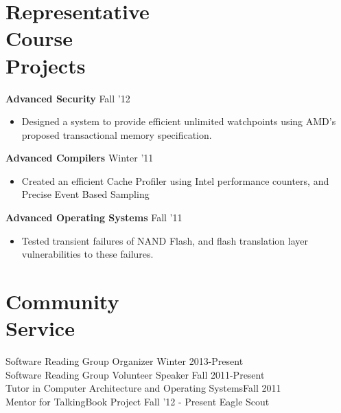 \documentclass[margin, 10pt]{res} %
\begin{document}
\begin{resume}
\section{Representative \\ Course \\ Projects}
\textbf{Advanced Security} \hfill Fall '12
\begin{itemize}
\item Designed a system to provide efficient unlimited watchpoints
	using AMD's proposed transactional memory specification.
\end{itemize}

\textbf{Advanced Compilers} \hfill Winter '11
\begin{itemize}
\item Created an efficient Cache Profiler using Intel performance
	counters, and Precise Event Based Sampling
\end{itemize}

\textbf{Advanced Operating Systems} \hfill Fall '11
\begin{itemize}
\item Tested transient failures of NAND Flash, and flash translation
	layer vulnerabilities to these failures.
\end{itemize}

\section{Community \\ Service}
Software Reading Group Organizer \hfill Winter 2013-Present \\
Software Reading Group Volunteer Speaker \hfill Fall 2011-Present \\
Tutor in Computer Architecture and Operating Systems\hfill Fall 2011
\\
Mentor for TalkingBook Project \hfill Fall '12 - Present
Eagle Scout \\

\end{resume}
\end{document}
